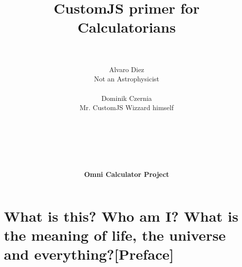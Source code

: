 \documentclass[11pt,a4paper,oldfontcommands]{memoir}
\begin{document}
%
%
\thispagestyle{empty}

{%

\centering
\title{ \normalsize \textsc{}
		\\ [2.0cm]
		\hline \vspace{10pt} \\
		\huge \textbf{CustomJS primer for Calculatorians\textsuperscript{\textregistered}} \vspace{5pt}
		\textbf{\hline}{\hline} \\ [0.5cm]
		\large \vspace{200pt}\\}		}
		


\author{\LARGE Alvaro Diez \\
		Not an Astrophysicist\texttrademark \\ \\
		\LARGE Dominik Czernia \\
		Mr. CustomJS Wizzard himself \\ \\ \\ \\ \\ \\ \\
		\LARGE {\textbf{Omni Calculator Project}} \vspace{-50pt}
} 
		
\maketitle
\noalign
\clearpage

\tableofcontents

\clearpage


\chapter{What is this? Who am I? What is the meaning of life, the universe and everything?[Preface]}

    \label{preface}
\end{document}
